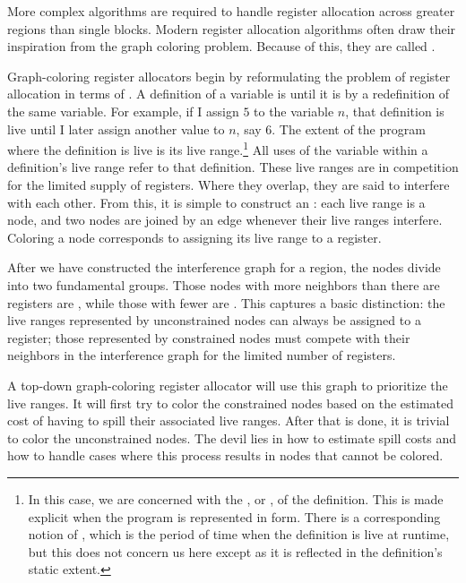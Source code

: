 More complex algorithms are required to handle register allocation across greater regions than single blocks. Modern register allocation algorithms often draw their inspiration from the graph coloring problem. Because of this, they are called .

Graph-coloring register allocators begin by reformulating the problem of register allocation in terms of . A definition of a variable is  until it is  by a redefinition of the same variable. For example, if I assign $5$ to the variable $n$, that definition is live until I later assign another value to $n$, say $6$. The extent of the program where the definition is live is its live range.\footnote{In this case, we are concerned with the , or , of the definition. This is made explicit when the program is represented in \SSA[long] form. There is a corresponding notion of , which is the period of time when the definition is live at runtime, but this does not concern us here except as it is reflected in the definition's static extent.} All uses of the variable within a definition's live range refer to that definition. These live ranges are in competition for the limited supply of registers. Where they overlap, they are said to interfere with each other. From this, it is simple to construct an : each live range is a node, and two nodes are joined by an edge whenever their live ranges interfere. Coloring a node corresponds to assigning its live range to a register.

After we have constructed the interference graph for a region, the nodes divide into two fundamental groups. Those nodes with more neighbors than there are registers are , while those with fewer are . This captures a basic distinction: the live ranges represented by unconstrained nodes can always be assigned to a register; those represented by constrained nodes must compete with their neighbors in the interference graph for the limited number of registers.

A top-down graph-coloring register allocator will use this graph to prioritize the live ranges. It will first try to color the constrained nodes based on the estimated cost of having to spill their associated live ranges. After that is done, it is trivial to color the unconstrained nodes. The devil lies in how to estimate spill costs and how to handle cases where this process results in nodes that cannot be colored. 

